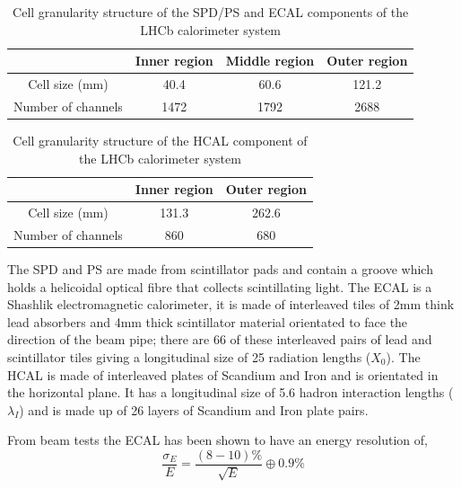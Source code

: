 \begin{table}[htdp]
	\caption{Cell granularity structure of the SPD/PS and ECAL components of the LHCb calorimeter system}
	\begin{center}
		\begin{tabular}{|c|c|c|c|}
			\hline
			& Inner region & Middle region & Outer region \\
			\hline
			Cell size (mm) & 40.4 & 60.6 & 121.2 \\
			\hline
			Number of channels & 1472 & 1792 & 2688 \\
			\hline
		\end{tabular}
	\end{center}
	\label{table: Calorimeter details}
\end{table}%

\begin{table}[htdp]
	\caption{Cell granularity structure of the HCAL component of the LHCb calorimeter system}
	\begin{center}
		\begin{tabular}{|c|c|c|}
			\hline
			& Inner region & Outer region \\
			\hline
			Cell size (mm) & 131.3 & 262.6 \\
			\hline
			Number of channels & 860 & 680 \\
			\hline
		\end{tabular}
	\end{center}
	\label{table: Calorimeter details2}
\end{table}%


The SPD and PS are made from scintillator pads and contain a groove which holds a helicoidal optical fibre that collects scintillating light. The ECAL is a Shashlik electromagnetic calorimeter, it is made of interleaved tiles of 2mm think lead absorbers and 4mm thick scintillator material orientated to face the direction of the beam pipe; there are 66 of these interleaved pairs of lead and scintillator tiles giving a longitudinal size of 25 radiation lengths ($X_0$). The HCAL is made of interleaved plates of Scandium and Iron and is orientated in the horizontal plane. It has a longitudinal size of 5.6 hadron interaction lengths ($\lambda_I$) and is made up of 26 layers of Scandium and Iron plate pairs.

From beam tests \cite{1742-6596-293-1-012052} the ECAL has been shown to have an energy resolution of,
\begin{equation*}
	\frac{\sigma_E}{{E}} = \frac{(8-10)\%}{\sqrt{E}} \oplus 0.9\%
\end{equation*}

